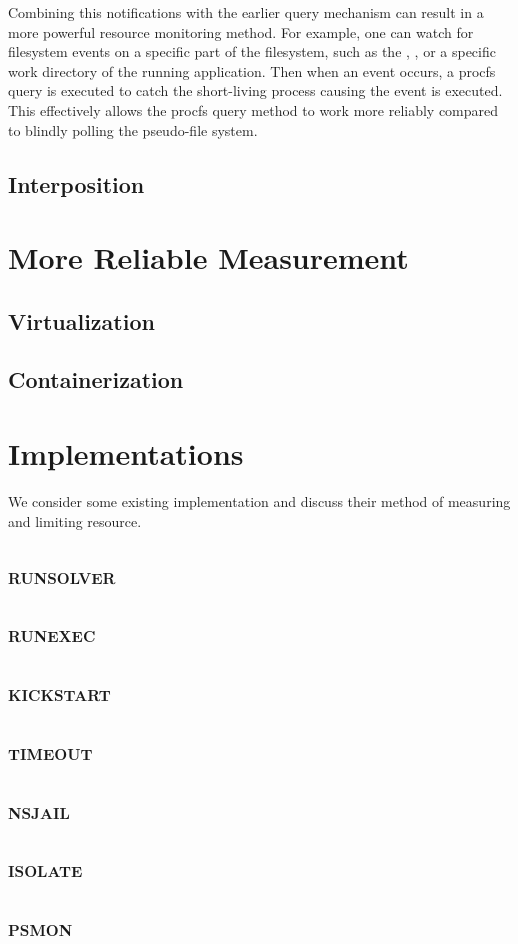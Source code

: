 Combining this notifications with the earlier query mechanism can result in a more powerful resource monitoring method.
For example, one can watch for filesystem events on a specific part of the filesystem, such as the , , or a specific work directory of the running application. Then when an event occurs, a procfs query is executed to catch the short-living process causing the event is executed.
This effectively allows the procfs query method to work more reliably compared to blindly polling the pseudo-file system.

\subsection{Interposition}



\section{More Reliable Measurement}

\subsection{Virtualization}

\subsection{Containerization}


\section{Implementations}

We consider some existing implementation and discuss their method of measuring and limiting resource.

\subsection{\textsc{runsolver}}
\subsection{\textsc{runexec}}
\subsection{\textsc{kickstart}}
\subsection{\textsc{timeout}}
\subsection{\textsc{nsjail}}
\subsection{\textsc{isolate}}
\subsection{\textsc{psmon}}
